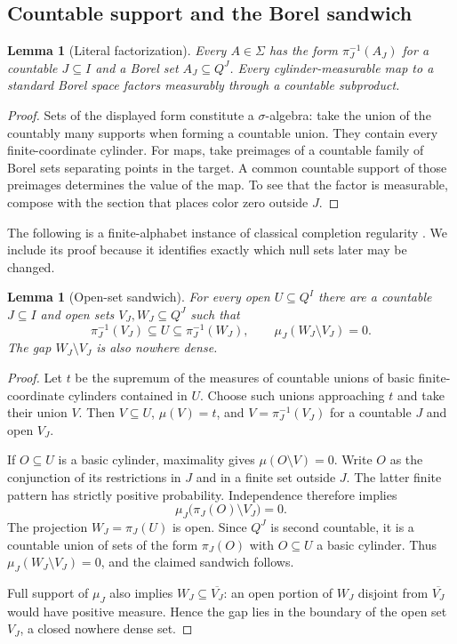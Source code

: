 \documentclass[11pt,letterpaper]{article}
\newtheorem{lemma}[theorem]{Lemma}
\theoremstyle{definition}
\newcommand{\cyl}{\Sigma}
\begin{document}
\subsection{Countable support and the Borel sandwich}

\begin{lemma}[Literal factorization]
\label{mbg:ext:lem:literal}
Every $A\in\cyl$ has the form $\pi_J^{-1}(A_J)$ for a countable $J\subseteq I$ and a Borel set $A_J\subseteq Q^J$. Every cylinder-measurable map to a standard Borel space factors measurably through a countable subproduct.
\end{lemma}
\begin{proof}
Sets of the displayed form constitute a $\sigma$-algebra: take the union of the countably many supports when forming a countable union. They contain every finite-coordinate cylinder. For maps, take preimages of a countable family of Borel sets separating points in the target. A common countable support of those preimages determines the value of the map. To see that the factor is measurable, compose with the section that places color zero outside $J$.
\end{proof}

The following is a finite-alphabet instance of classical completion regularity \cite{ext:Kakutani,ext:GK}. We include its proof because it identifies exactly which null sets later may be changed.

\begin{lemma}[Open-set sandwich]
\label{mbg:ext:lem:open}
For every open $U\subseteq Q^I$ there are a countable $J\subseteq I$ and open sets $V_J,W_J\subseteq Q^J$ such that
\[
\pi_J^{-1}(V_J)\subseteq U\subseteq\pi_J^{-1}(W_J),
\qquad \mu_J(W_J\setminus V_J)=0.
\]
The gap $W_J\setminus V_J$ is also nowhere dense.
\end{lemma}
\begin{proof}
Let $t$ be the supremum of the measures of countable unions of basic finite-coordinate cylinders contained in $U$. Choose such unions approaching $t$ and take their union $V$. Then $V\subseteq U$, $\mu(V)=t$, and $V=\pi_J^{-1}(V_J)$ for a countable $J$ and open $V_J$.

If $O\subseteq U$ is a basic cylinder, maximality gives $\mu(O\setminus V)=0$. Write $O$ as the conjunction of its restrictions in $J$ and in a finite set outside $J$. The latter finite pattern has strictly positive probability. Independence therefore implies
\[
\mu_J\bigl(\pi_J(O)\setminus V_J\bigr)=0.
\]
The projection $W_J=\pi_J(U)$ is open. Since $Q^J$ is second countable, it is a countable union of sets of the form $\pi_J(O)$ with $O\subseteq U$ a basic cylinder. Thus $\mu_J(W_J\setminus V_J)=0$, and the claimed sandwich follows.

Full support of $\mu_J$ also implies $W_J\subseteq\overline{V_J}$: an open portion of $W_J$ disjoint from $\overline{V_J}$ would have positive measure. Hence the gap lies in the boundary of the open set $V_J$, a closed nowhere dense set.
\end{proof}
\end{document}
